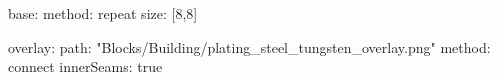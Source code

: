 base:
  method: repeat
  size: [8,8]

overlay:
  path: "Blocks/Building/plating_steel_tungsten_overlay.png"
  method: connect
  innerSeams: true
